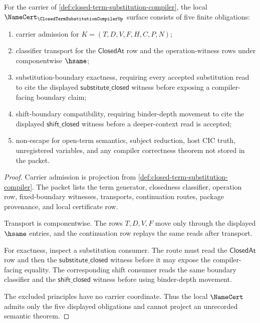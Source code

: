 \begin{theorem}
\label{thm:closed-term-substitution-compiler-namecert-obligations}
For the carrier of \autoref{def:closed-term-substitution-compiler}, the local $\NameCert_{\ClosedTermSubstitutionCompilerUp}$ surface consists of five finite obligations:
\begin{enumerate}
\item carrier admission for $K=(T,D,V,F,H,C,P,N)$;
\item classifier transport for the $\mathsf{ClosedAt}$ row and the operation-witness rows under componentwise $\hsame$;
\item substitution-boundary exactness, requiring every accepted substitution read to cite the displayed $\mathsf{substitute\_closed}$ witness before exposing a compiler-facing boundary claim;
\item shift-boundary compatibility, requiring binder-depth movement to cite the displayed $\mathsf{shift\_closed}$ witness before a deeper-context read is accepted;
\item non-escape for open-term semantics, subject reduction, host CIC truth, unregistered variables, and any compiler correctness theorem not stored in the packet.
\end{enumerate}
\end{theorem}
\begin{proof}
Carrier admission is projection from \autoref{def:closed-term-substitution-compiler}. The packet lists the term generator, closedness classifier, operation row, fixed-boundary witnesses, transports, continuation routes, package provenance, and local certificate row.

Transport is componentwise. The rows $T,D,V,F$ move only through the displayed $\hsame$ entries, and the continuation row replays the same reads after transport.

For exactness, inspect a substitution consumer. The route must read the $\mathsf{ClosedAt}$ row and then the $\mathsf{substitute\_closed}$ witness before it may expose the compiler-facing equality. The corresponding shift consumer reads the same boundary classifier and the $\mathsf{shift\_closed}$ witness before using binder-depth movement.

The excluded principles have no carrier coordinate. Thus the local $\NameCert$ admits only the five displayed obligations and cannot project an unrecorded semantic theorem.
\end{proof}

